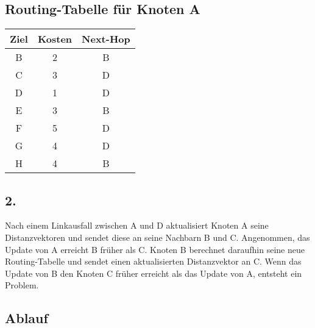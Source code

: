 \documentclass[a4paper]{scrartcl}
\begin{document}
\subsection*{Routing-Tabelle für Knoten A}

\begin{tabular}{|c|c|c|}
\hline
Ziel & Kosten & Next-Hop \\
\hline
B & 2 & B \\
\hline
C & 3 & D \\
\hline
D & 1 & D \\
\hline
E & 3 & B \\
\hline
F & 5 & D \\
\hline
G & 4 & D \\
\hline
H & 4 & B \\
\hline
\end{tabular}

\subsection*{2.}

Nach einem Linkausfall zwischen A und D aktualisiert Knoten A seine Distanzvektoren und sendet diese an seine Nachbarn B und C. Angenommen, das Update von A erreicht B früher als C. Knoten B berechnet daraufhin seine neue Routing-Tabelle und sendet einen aktualisierten Distanzvektor an C. Wenn das Update von B den Knoten C früher erreicht als das Update von A, entsteht ein Problem.

\subsection*{Ablauf}
\end{document}
